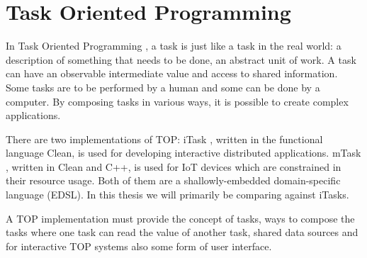 \section{Task Oriented Programming}\label{section-top}


In Task Oriented Programming \cite{plasmeijer2012task}, a task is just like a task in the real world: a description of something that needs to be done, an abstract unit of work. A task can have an observable intermediate value and access to shared information. Some tasks are to be performed by a human and some can be done by a computer. By composing tasks in various ways, it is possible to create complex applications.

There are two implementations of TOP: iTask \cite{plasmeijer2007itasks}, written in the functional language Clean, is used for developing interactive distributed applications. mTask \cite{koopman2018task, lubbers2019multitasking}, written in Clean and C++, is used for IoT devices which are constrained in their resource usage. Both of them are a shallowly-embedded domain-specific language (EDSL). In this thesis we will primarily be comparing against iTasks.

A TOP implementation must provide the concept of tasks, ways to compose the tasks where one task can read the value of another task, shared data sources and for interactive TOP systems also some form of user interface.



